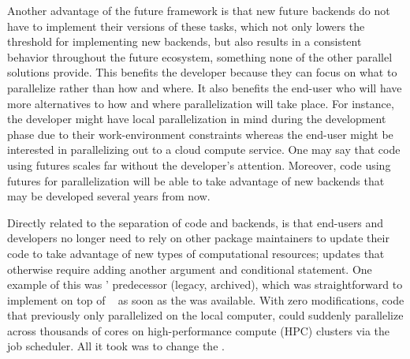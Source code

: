 Another advantage of the future framework is that new future backends
do not have to implement their versions of these tasks, which not only
lowers the threshold for implementing new backends, but also results
in a consistent behavior throughout the future ecosystem, something
none of the other parallel solutions provide.  This benefits the
developer because they can focus on what to parallelize rather than
how and where. It also benefits the end-user who will have more
alternatives to how and where parallelization will take place.  For
instance, the developer might have local parallelization in mind during
the development phase due to their work-environment constraints
whereas the end-user might be interested in parallelizing out to a
cloud compute service.  One may say that code using futures scales far
without the developer's attention.  Moreover, code using futures for
parallelization will be able to take advantage of new backends that
may be developed several years from now.

Directly related to the separation of code and backends, is that
end-users and developers no longer need to rely on other package
maintainers to update their code to take advantage of new types of
computational resources; updates that otherwise require adding another
argument and conditional statement.  One example of this
was ' predecessor
 (legacy, archived), which was straightforward to implement on top of
~\citep{Bischl_etal_2015} as soon as the 
was available.  With zero modifications, code that previously only
parallelized on the local computer, could suddenly parallelize across
thousands of cores on high-performance compute (HPC) clusters via the
job scheduler.  All it took was to change the .

